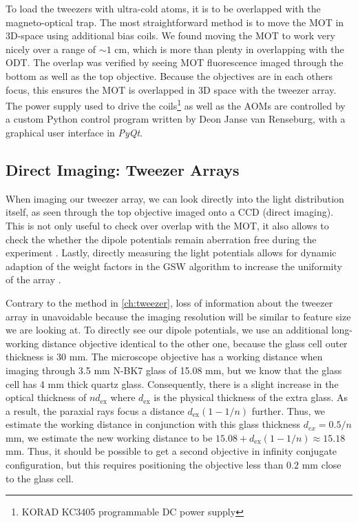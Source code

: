 To load the tweezers with ultra-cold atoms, it is to be overlapped with the magneto-optical trap.
The most straightforward method is to move the MOT in 3D-space using additional bias coils.
We found moving the MOT to work very nicely over a range of $\sim 1$ cm, which is more than plenty in overlapping with the \ac{ODT}.
The overlap was verified by seeing MOT fluorescence imaged through the bottom as well as the top objective.
Because the objectives are in each others focus, this ensures the MOT is overlapped in 3D space with the tweezer array.
The power supply used to drive the coils\footnote{KORAD KC3405 programmable DC power supply} as well as the \ac{AOM}s are controlled by a custom Python control program written by Deon Janse van Renseburg, with a graphical user interface in \textit{PyQt}.



\subsection{Direct Imaging: Tweezer Arrays}\label{sec:TweezerImaging}

When imaging our tweezer array, we can look directly into the light distribution itself, as seen through the top objective imaged onto a CCD (direct imaging).
This is not only useful to check over overlap with the MOT, it also allows to check the whether the dipole potentials remain aberration free during the experiment \cite{Baumgaertner2017}.
Lastly, directly measuring the light potentials allows for dynamic adaption of the weight factors in the \ac{GSW} algorithm to increase the uniformity of the array \cite{Nogrette2014}.

Contrary to the method in \cref{ch:tweezer}, loss of information about the tweezer array in unavoidable because the imaging resolution will be similar to feature size we are looking at.
To directly see our dipole potentials, we use an additional long-working distance objective identical to the other one, because the glass cell outer thickness is 30 mm. 
The microscope objective has a working distance when imaging through 3.5 mm N-BK7 glass of 15.08 mm, but we know that the glass cell has 4 mm thick quartz glass.
Consequently, there is a slight increase in the optical thickness of $n d_{\text{ex}}$ where $d_{\text{ex}}$ is the physical thickness of the extra glass.
As a result, the paraxial rays focus a distance $d_{\text{ex}}(1-1/n)$ further.
Thus, we estimate the working distance in conjunction with this glass thickness $d_{ex} = 0.5/n$ mm, we estimate the new working distance to be $15.08 + d_{\text{ex}}(1-1/n) \approx 15.18$ mm.
Thus, it should be possible to get a second objective in infinity conjugate configuration, but this requires positioning the objective less than $0.2$ mm close to the glass cell.

